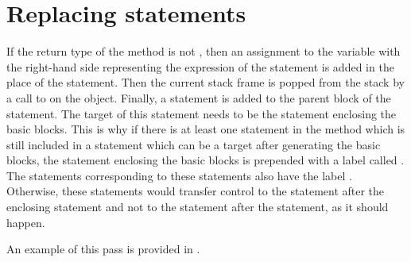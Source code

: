 \section{Replacing  statements}

If the return type of the method is not , then an assignment to the  variable with the right-hand side
representing the expression of the  statement is added in the place of the  statement. Then the
current stack frame is popped from the stack by a call to  on the  object. Finally, a
 statement is added to the parent block of the  statement. The target of this 
statement needs to be the  statement enclosing the basic blocks. This is why if there is at least one
 statement in the method which is still included in a statement which can be a  target
after generating the basic blocks, the  statement enclosing the basic blocks is prepended with a label
called . The  statements corresponding to these  statements also
have the label . Otherwise, these  statements would transfer control to the statement after
the enclosing statement and not to the statement after the  statement, as it should happen.

An example of this pass is provided in .

